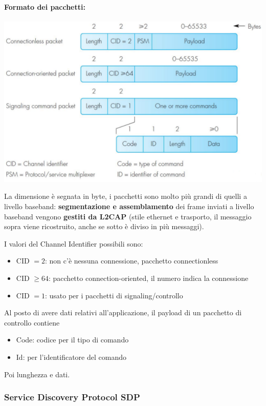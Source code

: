 \paragraph{Formato dei pacchetti:}
\begin{center}
	\includegraphics[width=0.9\linewidth]{img/wpan/l2cappacket}
\end{center}

La dimensione è segnata in byte, i pacchetti sono molto più grandi di quelli a livello baseband: \textbf{segmentazione e assemblamento} dei frame inviati a livello baseband vengono \textbf{gestiti da L2CAP} (stile ethernet e trasporto, il messaggio sopra viene ricostruito, anche se sotto è diviso in più messaggi).

I valori del Channel Identifier possibili sono: 
\begin{itemize}
	\item CID $= 2$: non c'è nessuna connessione, pacchetto connectionless
	
    \item CID $\geq 64$: pacchetto connection-oriented, il numero indica la connessione
	
    \item CID $=1$: usato per i pacchetti di signaling/controllo
\end{itemize}

Al posto di avere dati relativi all'applicazione, il payload di un pacchetto di controllo contiene
\begin{itemize}
	\item Code: codice per il tipo di comando 
	
    \item Id: per l'identificatore del comando
\end{itemize}
Poi lunghezza e dati.

\subsubsection{Service Discovery Protocol SDP}

